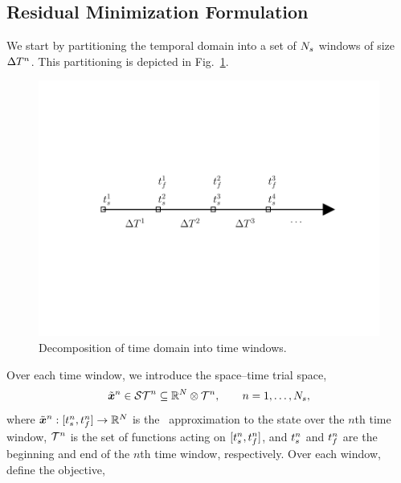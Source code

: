 \subsection{Residual Minimization Formulation} 
We start by partitioning the
temporal domain into a set of $N_s$ windows of size $\Delta T^{n}$. This partitioning is depicted in Fig.~\ref{fig:slab_fig}.
\begin{figure} 
\begin{centering} 
\includegraphics[trim={0.0cm 5cm 0cm 3cm},clip,width=1.0\textwidth]{figs/time_grid.pdf} \caption{Decomposition of time
domain into time windows.} \label{fig:slab_fig} \end{centering} 
\end{figure}
Over each time window, we introduce the space--time trial space,
$$\tilde{\boldsymbol x}^n \in \mathcal{ ST }^n \subseteq \mathbb{R}^{N} \otimes \mathcal{T}^{n} , \qquad  n = 1,\ldots,N_s,$$ 
where $\tilde{\boldsymbol x}^n :  [t_s^{n} , t_f^{n}] \rightarrow
\mathbb{R}^{N}$
is the \methodAcronym\ approximation to the state over the $n$th time window, $\mathcal{T}^{n}$ is the set of functions acting on $[t_s^{n},t_f^{n}]$, and  
$t_s^{n}$ and $t_f^{n}$ are the beginning and end of the $n$th
time window, respectively. Over each window, define the objective,
